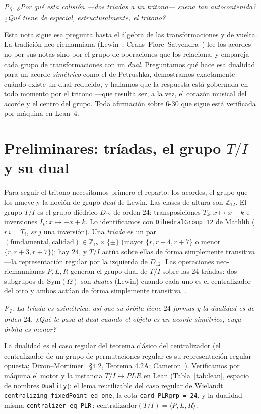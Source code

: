 \documentclass[11pt]{article}
\newcommand{\lean}[1]{\texttt{#1}}
\newcommand{\Ztwelve}{\mathbb{Z}_{12}}
\newcommand{\Dgrp}[1]{D_{#1}}
\newcommand{\question}[1]{\smallskip\noindent\textit{#1}\smallskip}
\begin{document}
\question{P\textsubscript{0}. ¿Por qué \emph{esta} colisión ---dos tríadas a un tritono--- suena tan
autocontenida? ¿Qué tiene de especial, estructuralmente, el tritono?}

Esta nota sigue esa pregunta hasta el álgebra de las transformaciones y de vuelta. La tradición
neo-riemanniana (Lewin~\cite{Lewin}; Crans--Fiore--Satyendra~\cite{CFS}) lee los acordes no por sus notas
sino por el grupo de operaciones que los relaciona, y empareja cada grupo de transformaciones con un
\emph{dual}. Preguntamos qué hace esa dualidad para un acorde \emph{simétrico} como el de Petrushka,
demostramos exactamente cuándo existe un dual reducido, y hallamos que la respuesta está gobernada en
todo momento por el tritono ---que resulta ser, a la vez, el corazón musical del acorde y el centro del
grupo. Toda afirmación sobre 6-30 que sigue está verificada por máquina en Lean~4.

\section{Preliminares: tríadas, el grupo $T/I$ y su dual}\label{sec:setup}

Para seguir el tritono necesitamos primero el reparto: los acordes, el grupo que los mueve y la noción de
grupo \emph{dual} de Lewin. Las clases de altura son $\Ztwelve$. El grupo $T/I$ es el grupo diédrico
$\Dgrp{12}$ de orden $24$: transposiciones $T_k:x\mapsto x+k$ e inversiones $I_k:x\mapsto -x+k$. Lo
identificamos con \lean{DihedralGroup 12} de Mathlib ($r\,i = T_i$, $sr\,j$ una inversión). Una
\emph{tríada} es un par $(\mathrm{fundamental},\mathrm{calidad})\in\Ztwelve\times\{\pm\}$ (mayor
$\{r,r+4,r+7\}$ o menor $\{r,r+3,r+7\}$); hay $24$, y $T/I$ actúa sobre ellas de forma simplemente
transitiva ---la representación regular por la izquierda de $\Dgrp{12}$. Las operaciones
neo-riemannianas $P,L,R$ generan el grupo dual de $T/I$ sobre las $24$ tríadas: dos subgrupos de
$\mathrm{Sym}(\Omega)$ son \emph{duales} (Lewin) cuando cada uno es el centralizador del otro y ambos
actúan de forma simplemente transitiva~\cite{CFS}.

\question{P\textsubscript{1}. La tríada es asimétrica, así que su órbita tiene $24$ formas y la dualidad
es de orden $24$. ¿Qué le pasa al dual cuando el objeto es un acorde \emph{simétrico}, cuya órbita es
menor?}

La dualidad es el caso regular del teorema clásico del centralizador (el centralizador de un grupo de
permutaciones regular es su representación regular opuesta; Dixon--Mortimer~\cite{DM} \S4.2, Teorema 4.2A;
Cameron~\cite{Cam}). Verificamos por máquina el motor y la instancia $T/I\!\leftrightarrow\!PLR$ en Lean
(Tabla~\ref{tab:lean}, espacio de nombres \lean{Duality}): el lema reutilizable del caso regular de
Wielandt \lean{centralizing\_fixedPoint\_eq\_one}, la cota \lean{card\_PLRgrp = 24}, y la dualidad misma
\lean{centralizer\_eq\_PLR}\,: $\mathrm{centralizador}(T/I)=\langle P,L,R\rangle$.
\end{document}
